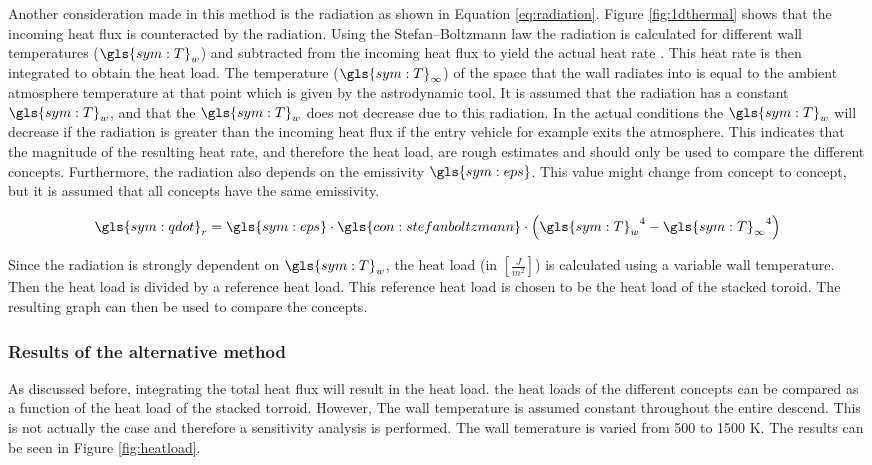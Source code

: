 Another consideration made in this method is the radiation as shown in Equation \ref{eq:radiation}. Figure \ref{fig:1dthermal} shows that the incoming heat flux is counteracted by the radiation. Using the Stefan–Boltzmann law the radiation is calculated for different wall temperatures ($\gls{sym:T}_w$) and subtracted from the incoming heat flux to yield the actual heat rate \cite{Holman2002}. This heat rate is then integrated to obtain the heat load. The temperature ($\gls{sym:T}_\infty$) of the space that the wall radiates into is equal to the ambient atmosphere temperature at that point which is given by the astrodynamic tool. It is assumed that the radiation has a constant $\gls{sym:T}_w$, and that the $\gls{sym:T}_w$ does not decrease due to this radiation. In the actual conditions the $\gls{sym:T}_w$ will decrease if the radiation is greater than the incoming heat flux if the entry vehicle for example exits the atmosphere. This indicates that the magnitude of the resulting heat rate, and therefore the heat load, are rough estimates and should only be used to compare the different concepts. Furthermore, the radiation also depends on the emissivity $ \gls{sym:eps}$. This value might change from concept to concept, but it is assumed that all concepts have the same emissivity.

\begin{equation}
\label{eq:radiation}
\gls{sym:qdot}_r = \gls{sym:eps} \cdot \gls{con:stefanboltzmann} \cdot \left( {\gls{sym:T}_w}^4 - {\gls{sym:T}_\infty}^4  \right)
\end{equation}


Since the radiation is strongly dependent on $\gls{sym:T}_w$, the heat load (in $\left[\frac{J}{m^2}\right]$) is calculated using a variable wall temperature. Then the heat load is divided by a reference heat load. This reference heat load is chosen to be the heat load of the stacked toroid. The resulting graph can then be used to compare the concepts.

\subsubsection{Results of the alternative method}
As discussed before, integrating the total heat flux will result in the heat load. the heat loads of the different concepts can be compared as a function of the heat load of the stacked torroid. However, The wall temperature is assumed constant throughout the entire descend. This is not actually the case and therefore a sensitivity analysis is performed. The wall temerature is varied from 500 to 1500 K. The results can be seen in Figure \ref{fig:heatload}.

